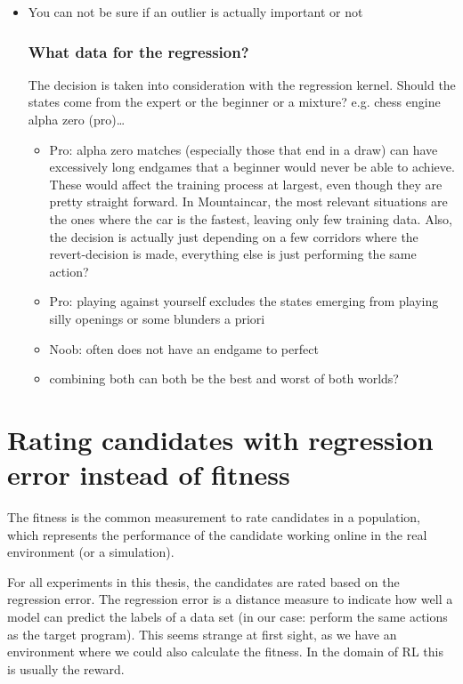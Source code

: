 \begin{itemize}
\item You can not be sure if an outlier is actually important or not


\subsubsection{What data for the regression?}
The decision is taken into consideration with the regression kernel. Should the states come from the expert or the beginner or a mixture?
e.g. chess engine alpha zero (pro)…
\begin{itemize}
    \item Pro: alpha zero matches (especially those that end in a draw) can have excessively long endgames that a beginner would never be able to achieve. These would affect the training process at largest, even though they are pretty straight forward. In Mountaincar, the most relevant situations are the ones where the car is the fastest, leaving only few training data. Also, the decision is actually just depending on a few corridors where the revert-decision is made, everything else is just performing the same action?
    \item Pro: playing against yourself excludes the states emerging from playing silly openings or some blunders a priori
    \item Noob: often does not have an endgame to perfect
    \item combining both can both be the best and worst of both worlds?
\end{itemize}

\end{itemize}



\section{Rating candidates with regression error instead of fitness}


The fitness is the common measurement to rate candidates in a population, which represents the performance of the candidate working online in the real environment (or a simulation).

For all experiments in this thesis, the candidates are rated based on the regression error. The regression error is a distance measure to indicate how well a model can predict the labels of a data set (in our case: perform the same actions as the target program). This seems strange at first sight, as we have an environment where we could also calculate the fitness.  In the domain of RL this is usually the reward.

